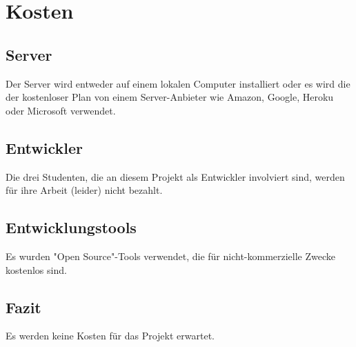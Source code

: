 \section{Kosten}
\subsection{Server}
Der Server wird entweder auf einem lokalen Computer installiert oder es wird die der kostenloser Plan von einem Server-Anbieter wie Amazon, Google, Heroku oder Microsoft verwendet.

\subsection{Entwickler}
Die drei Studenten, die an diesem Projekt als Entwickler involviert sind, werden für ihre Arbeit (leider) nicht bezahlt.

\subsection{Entwicklungstools}
Es wurden "Open Source"-Tools verwendet, die für nicht-kommerzielle Zwecke kostenlos sind.

\subsection{Fazit}
Es werden keine Kosten für das Projekt erwartet.